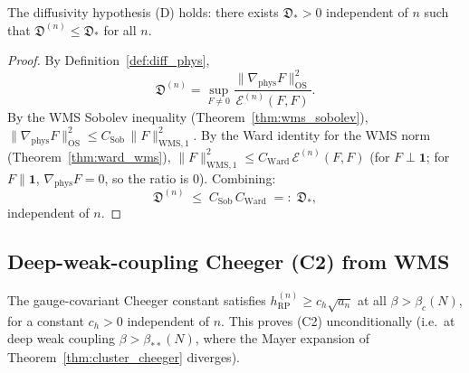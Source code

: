 \begin{theorem}
\label{thm:D_from_wms}
The diffusivity hypothesis (D) holds: there exists
$\mathfrak{D}_{*}>0$ independent of $n$ such that
$\mathfrak{D}^{(n)}\le\mathfrak{D}_{*}$ for all $n$.
\end{theorem}

\begin{proof}
By Definition~\ref{def:diff_phys},
\[
  \mathfrak{D}^{(n)}
  =\sup_{F\ne 0}\frac{\|\nabla_{\mathrm{phys}}F\|_{\mathrm{OS}}^{2}}
   {\mathcal{E}^{(n)}(F,F)}.
\]
By the WMS Sobolev inequality (Theorem~\ref{thm:wms_sobolev}),
$\|\nabla_{\mathrm{phys}}F\|_{\mathrm{OS}}^{2}\le
C_{\mathrm{Sob}}\,\|F\|_{\mathrm{WMS},1}^{2}$. By the Ward identity
for the WMS norm (Theorem~\ref{thm:ward_wms}),
$\|F\|_{\mathrm{WMS},1}^{2}\le
C_{\mathrm{Ward}}\,\mathcal{E}^{(n)}(F,F)$ (for
$F\perp\mathbf{1}$; for $F\parallel\mathbf{1}$,
$\nabla_{\mathrm{phys}}F=0$, so the ratio is $0$). Combining:
\[
  \mathfrak{D}^{(n)}
  \;\le\;C_{\mathrm{Sob}}\,C_{\mathrm{Ward}}
  \;=:\;\mathfrak{D}_{*},
\]
independent of $n$.
\end{proof}

\subsection{Deep-weak-coupling Cheeger (C2) from WMS}
\label{ssec:C2_from_wms}

\begin{theorem}
\label{thm:C2_from_wms}
The gauge-covariant Cheeger constant satisfies
$h_{\mathrm{RP}}^{(n)}\ge c_{h}\sqrt{a_{n}}$ at all
$\beta>\beta_{c}(N)$, for a constant $c_{h}>0$ independent of $n$.
This proves (C2) unconditionally (i.e.\ at deep weak coupling
$\beta>\beta_{**}(N)$, where the Mayer expansion of
Theorem~\ref{thm:cluster_cheeger} diverges).
\end{theorem}

